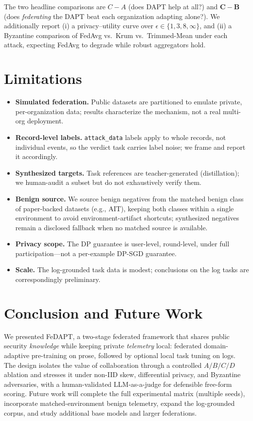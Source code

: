 \documentclass[11pt,a4paper]{article}
\begin{document}
\noindent The two headline comparisons are $C-A$ (does DAPT help at all?) and $\mathbf{C-B}$ (does \emph{federating} the DAPT beat each organization adapting alone?). We additionally report (i) a privacy--utility curve over $\epsilon \in \{1,3,8,\infty\}$, and (ii) a Byzantine comparison of FedAvg vs.\ Krum vs.\ Trimmed-Mean under each attack, expecting FedAvg to degrade while robust aggregators hold.

\section{Limitations}
\label{sec:limitations}
\begin{itemize}
    \item \textbf{Simulated federation.} Public datasets are partitioned to emulate private, per-organization data; results characterize the mechanism, not a real multi-org deployment.
    \item \textbf{Record-level labels.} \texttt{attack\_data} labels apply to whole records, not individual events, so the verdict task carries label noise; we frame and report it accordingly.
    \item \textbf{Synthesized targets.} Task references are teacher-generated (distillation); we human-audit a subset but do not exhaustively verify them.
    \item \textbf{Benign source.} We source benign negatives from the matched benign class of paper-backed datasets (e.g., AIT), keeping both classes within a single environment to avoid environment-artifact shortcuts; synthesized negatives remain a disclosed fallback when no matched source is available.
    \item \textbf{Privacy scope.} The DP guarantee is user-level, round-level, under full participation---not a per-example DP-SGD guarantee.
    \item \textbf{Scale.} The log-grounded task data is modest; conclusions on the log tasks are correspondingly preliminary.
\end{itemize}

\section{Conclusion and Future Work}
We presented FeDAPT, a two-stage federated framework that shares public security \emph{knowledge} while keeping private \emph{telemetry} local: federated domain-adaptive pre-training on prose, followed by optional local task tuning on logs. The design isolates the value of collaboration through a controlled $A/B/C/D$ ablation and stresses it under non-IID skew, differential privacy, and Byzantine adversaries, with a human-validated LLM-as-a-judge for defensible free-form scoring. Future work will complete the full experimental matrix (multiple seeds), incorporate matched-environment benign telemetry, expand the log-grounded corpus, and study additional base models and larger federations.
\end{document}
